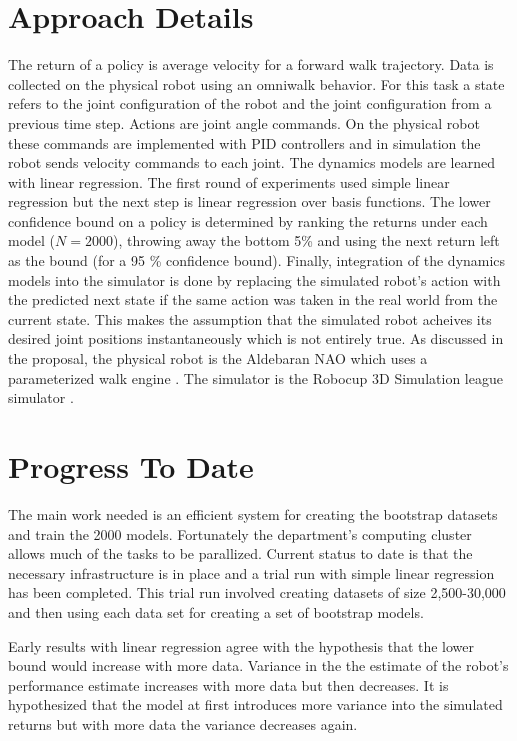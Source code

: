 \documentclass[12 pt]{article}
\begin{document}
\section{Approach Details}

The return of a policy is average velocity for a forward walk trajectory. Data is collected on the physical robot using an omniwalk behavior. For this task a state refers to the joint configuration of the robot and the joint configuration from a previous time step. Actions are joint angle commands. On the physical robot these commands are implemented with PID controllers and in simulation the robot sends velocity commands to each joint. The dynamics models are learned with linear regression. The first round of experiments used simple linear regression but the next step is linear regression over basis functions. The lower confidence bound on a policy is determined by ranking the returns under each model ($N = 2000$), throwing away the bottom 5\% and using the next return left as the bound (for a 95 \% confidence bound). Finally, integration of the dynamics models  into the simulator is done by replacing the simulated robot's action with the predicted next state if the same action was taken in the real world from the current state. This makes the assumption that the simulated robot acheives its desired joint positions instantaneously which is not entirely true. As discussed in the proposal, the physical robot is the Aldebaran NAO which uses a parameterized walk engine \cite{ashar2014robocup}. The simulator is the Robocup 3D Simulation league simulator \cite{simspark}.

\section{Progress To Date}

The main work needed is an efficient system for creating the bootstrap datasets and train the 2000 models. Fortunately the department's computing cluster allows much of the tasks to be parallized. Current status to date is that the necessary infrastructure is in place and a trial run with simple linear regression has been completed. This trial run involved creating datasets of size 2,500-30,000 and then using each data set for creating a set of bootstrap models. 

Early results with linear regression agree with the hypothesis that the lower bound would increase with more data. Variance in the the estimate of the robot's performance estimate increases with more data but then decreases. It is hypothesized that the model at first introduces more variance into the simulated returns but with more data the variance decreases again. 
\end{document}
